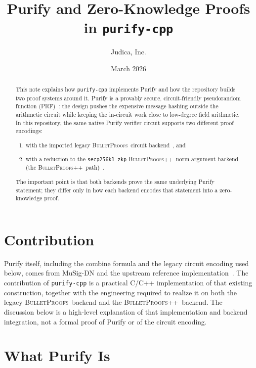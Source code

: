 \documentclass[11pt]{article}
\title{Purify and Zero-Knowledge Proofs in \texttt{purify-cpp}}
\author{Judica, Inc.}
\date{March 2026}
\DeclareRobustCommand{\bp}{{\normalfont\scshape BulletProofs}}
\DeclareRobustCommand{\bppp}{{\normalfont\scshape BulletProofs++}}
\begin{document}
\maketitle

\begin{abstract}
This note explains how \texttt{purify-cpp} implements Purify and how the repository builds two proof systems
around it. Purify is a provably secure, circuit-friendly pseudorandom function
(PRF)~\cite{musig-dn,purify-ref}: the design pushes the expensive
message hashing
outside the arithmetic circuit while keeping the in-circuit work close to low-degree field
arithmetic. In this repository, the same native Purify verifier circuit supports two different
proof encodings:
\begin{enumerate}[nosep]
  \item with the imported legacy \bp\ circuit backend~\cite{bulletproofs}, and
  \item with a reduction to the \texttt{secp256k1-zkp} \bppp\ norm-argument backend
  (the \bppp\ path)~\cite{bulletproofs-plus-plus,secp-zkp-main,secp-bppp}.
\end{enumerate}
The important point is that both backends prove the same underlying Purify statement; they differ
only in how each backend encodes that statement into a zero-knowledge proof.
\end{abstract}

\section{Contribution}
\label{sec:contribution}

Purify itself, including the combine formula and the legacy circuit encoding
used below, comes from MuSig-DN and the upstream reference
implementation~\cite{musig-dn,purify-ref}. The contribution of
\texttt{purify-cpp} is a practical C/C++ implementation of that existing
construction, together with the engineering required to realize it on both the
legacy \bp\ backend and the \bppp\ backend. The discussion below is a
high-level explanation of that implementation and backend integration, not a
formal proof of Purify or of the circuit encoding.

\section{What Purify Is}
\end{document}
